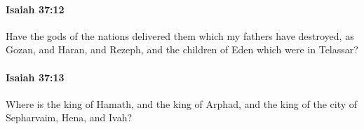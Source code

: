 		\paragraph{Isaiah 37:12} %
			\label{ISAIAH-37-12}

			Have the gods of the nations delivered them which my fathers have destroyed, as Gozan, and Haran, and Rezeph, and the children of Eden which were in Telassar?


		\paragraph{Isaiah 37:13} %
			\label{ISAIAH-37-13}

			Where is the king of Hamath, and the king of Arphad, and the king of the city of Sepharvaim, Hena, and Ivah?


